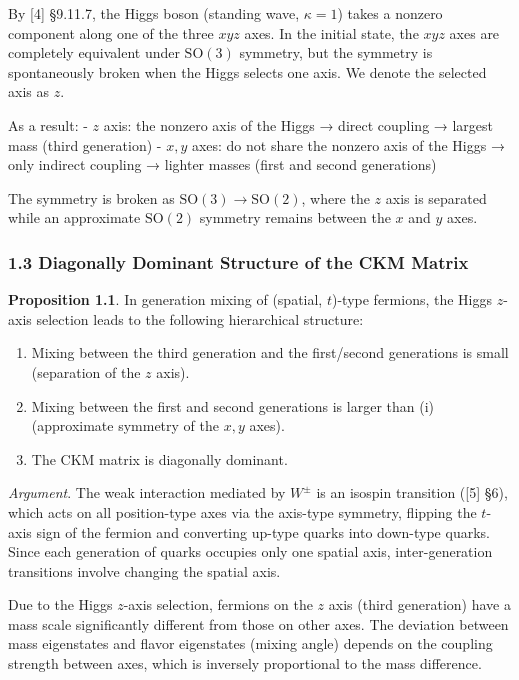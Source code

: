 \documentclass[
  a4paper,11pt]{article}
\begin{document}
By {[}4{]} §9.11.7, the Higgs boson (standing wave, \(\kappa = 1\))
takes a nonzero component along one of the three \(xyz\) axes. In the
initial state, the \(xyz\) axes are completely equivalent under
\(\mathrm{SO}(3)\) symmetry, but the symmetry is spontaneously broken
when the Higgs selects one axis. We denote the selected axis as \(z\).

As a result: - \(z\) axis: the nonzero axis of the Higgs → direct
coupling → largest mass (third generation) - \(x, y\) axes: do not share
the nonzero axis of the Higgs → only indirect coupling → lighter masses
(first and second generations)

The symmetry is broken as \(\mathrm{SO}(3) \to \mathrm{SO}(2)\), where
the \(z\) axis is separated while an approximate \(\mathrm{SO}(2)\)
symmetry remains between the \(x\) and \(y\) axes.

\subsubsection{1.3 Diagonally Dominant Structure of the CKM
Matrix}\label{diagonally-dominant-structure-of-the-ckm-matrix}

\textbf{Proposition 1.1}. In generation mixing of (spatial, \(t\))-type
fermions, the Higgs \(z\)-axis selection leads to the following
hierarchical structure:

\begin{enumerate}
\def\labelenumi{(\roman{enumi})}
\item
  Mixing between the third generation and the first/second generations
  is small (separation of the \(z\) axis).
\item
  Mixing between the first and second generations is larger than (i)
  (approximate symmetry of the \(x, y\) axes).
\item
  The CKM matrix is diagonally dominant.
\end{enumerate}

\emph{Argument}. The weak interaction mediated by \(W^{\pm}\) is an
isospin transition ({[}5{]} §6), which acts on all position-type axes
via the axis-type symmetry, flipping the \(t\)-axis sign of the fermion
and converting up-type quarks into down-type quarks. Since each
generation of quarks occupies only one spatial axis, inter-generation
transitions involve changing the spatial axis.

Due to the Higgs \(z\)-axis selection, fermions on the \(z\) axis (third
generation) have a mass scale significantly different from those on
other axes. The deviation between mass eigenstates and flavor
eigenstates (mixing angle) depends on the coupling strength between
axes, which is inversely proportional to the mass difference.
\end{document}
